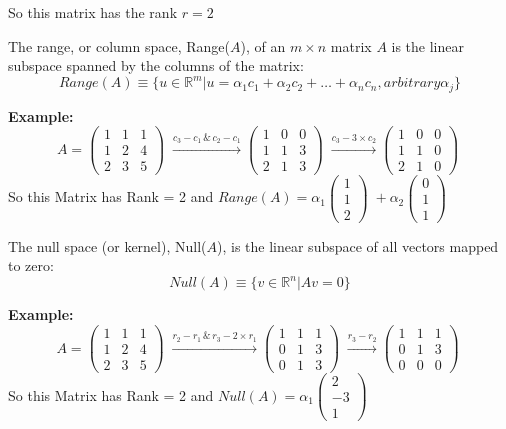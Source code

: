 \documentclass{article}
\begin{document}
				 So this matrix has the rank $r = 2$

\begin{tcolorbox}[colback=seashell,colframe=beaublue,title=Range]	
The range, or column space, Range($A$), of an $m \times n$ matrix $A$ is the linear
subspace spanned by the columns of the matrix:
			 $$ Range(A) \equiv \{u \in \mathbb{R}^{m} | u = \alpha_1 c_1 + \alpha_2 c_2 + \hdots + \alpha_n c_n , arbitrary \alpha_j \} $$
		 
\end{tcolorbox}
 \textbf{Example: } 
		 $$
			A = \begin{pmatrix} 1 & 1 & 1 \\ 1 & 2 & 4 \\ 2 & 3 & 5 \end{pmatrix} \; 
				\xrightarrow{c_3 - c_1 \, \& \, c_2 - c_1}
			 \begin{pmatrix} 1 & 0 & 0 \\ 1 & 1 & 3 \\ 2 & 1 & 3 \end{pmatrix} \; 
				 \xrightarrow{c_3 - 3\times c_2}
	         \begin{pmatrix} 1 & 0 & 0 \\ 1 & 1 & 0 \\ 2 & 1 & 0 \end{pmatrix} \; $$		
				 So this Matrix has Rank = 2 and $ Range (A) = \alpha_1 \begin{pmatrix} 1\\ 1 \\ 2 \end{pmatrix} \; +   \alpha_2 \begin{pmatrix} 0\\ 1 \\ 1 \end{pmatrix} \; $
\begin{tcolorbox}[colback=seashell,colframe=beaublue,title=Null Space]	

The null space (or kernel), Null($A$), is the linear subspace of all vectors mapped to zero:
			 $$ Null(A) \equiv \{v \in \mathbb{R}^{n} | Av = 0 \} $$
\end{tcolorbox}
		  \textbf{Example:} 
			 $$
			A =  \begin{pmatrix} 1 & 1 & 1 \\ 1 & 2 & 4 \\ 2 & 3 & 5 \end{pmatrix} \; 
				\xrightarrow{r_2 - r_1 \, \& \, r_3-2\times r_1}
			 \begin{pmatrix} 1 & 1 & 1 \\ 0 & 1 & 3 \\ 0 & 1 & 3 \end{pmatrix} \; 
				 \xrightarrow{r_3 - r_2}
		         \begin{pmatrix} 1 & 1 & 1 \\ 0 & 1 & 3 \\ 0 & 0 & 0 \end{pmatrix} \; $$
				 So this Matrix has Rank = 2 and $ Null(A) = \alpha_1 \begin{pmatrix} 2\\ -3 \\ 1 \end{pmatrix} \; $
\end{document}
